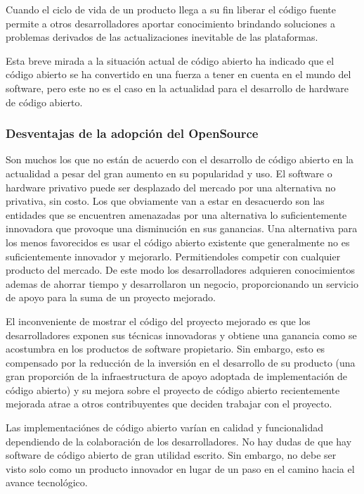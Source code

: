 Cuando el ciclo de vida de un producto llega a su fin liberar el código fuente permite a otros desarrolladores aportar conocimiento brindando soluciones a problemas derivados de las actualizaciones inevitable de las plataformas. 

Esta breve mirada a la situación actual de código abierto ha indicado que el código abierto se ha convertido en una fuerza a tener en cuenta en el mundo del software, pero este no es el caso en la actualidad para el desarrollo de hardware de código abierto.


\subsubsection{Desventajas de la adopción del OpenSource}

Son muchos los que no están de acuerdo con el desarrollo de código abierto en la actualidad a pesar del gran aumento en su popularidad y uso. El software o hardware privativo puede ser desplazado del mercado por una alternativa no privativa, sin costo. Los que obviamente van a estar en desacuerdo son las entidades que se encuentren amenazadas por una alternativa lo suficientemente innovadora que provoque una disminución en sus ganancias. Una alternativa para los menos favorecidos es usar el código abierto existente que generalmente no es suficientemente innovador y mejorarlo. Permitiendoles competir con cualquier producto del mercado. De este modo los desarrolladores adquieren conocimientos ademas de ahorrar tiempo y desarrollaron un negocio, proporcionando un servicio de apoyo para la suma de un proyecto mejorado.


El inconveniente de mostrar el código del proyecto mejorado es que los desarrolladores exponen sus técnicas innovadoras y obtiene una ganancia como se acostumbra en los productos de software propietario. Sin embargo, esto es compensado por la reducción de la inversión en el desarrollo de su producto (una gran proporción de
la infraestructura de apoyo adoptada de implementación de código abierto) y su mejora sobre el proyecto de código abierto recientemente mejorada atrae a otros contribuyentes que deciden trabajar con el proyecto.

Las implementaciónes de código abierto varían en calidad y funcionalidad dependiendo de la colaboración de los desarrolladores. No hay dudas de que hay software de código abierto de gran utilidad escrito. Sin embargo, no debe ser visto solo como un producto innovador en lugar de un paso en el camino hacia el avance tecnológico.

